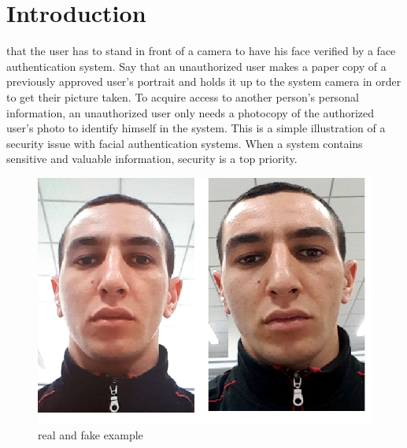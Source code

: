 \documentclass[journal]{IEEEtran}
\begin{document}
%
\IEEEpeerreviewmaketitle



\section{Introduction}
% 
% 
% 
% 
 that the user has to stand in front of a camera to have his face verified by a face authentication system. Say that an unauthorized user makes a paper copy of a previously approved user's portrait and holds it up to the system camera in order to get their picture taken. To acquire access to another person's personal information, an unauthorized user only needs a photocopy of the authorized user's photo to identify himself in the system. This is a simple illustration of a security issue with facial authentication systems. When a system contains sensitive and valuable information, security is a top priority.
\begin{figure}[t]
	\centerline{\includegraphics[width=\linewidth]{img/realAndFakeEx}}
	\caption{real and fake example\cite{boulkenafet2017oulu}}
	\label{fig:realandfake}
\end{figure}
\end{document}
